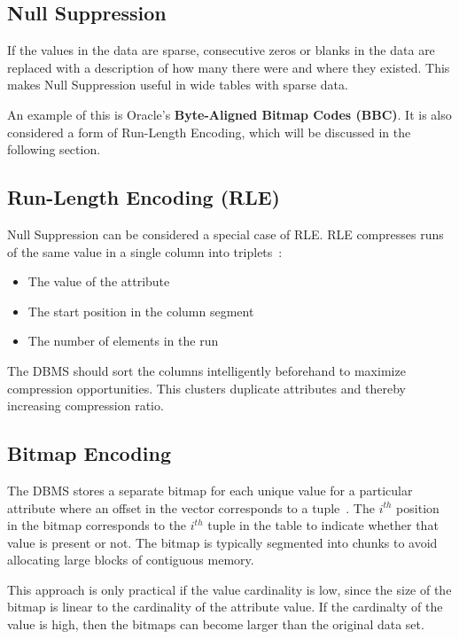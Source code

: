 \documentclass[11pt]{article}
\begin{document}
\subsection*{Null Suppression}
If the values in the data are sparse, consecutive zeros or blanks in the data are replaced with a description of how many there were and where they existed. This makes Null Suppression useful in wide tables with sparse data.

An example of this is Oracle’s \textbf{Byte-Aligned Bitmap Codes (BBC)}. It is also considered a form of Run-Length Encoding, which will be discussed in the following section.

\subsection*{Run-Length Encoding (RLE)}
Null Suppression can be considered a special case of RLE. RLE compresses runs of the same value
in a single column into triplets~\cite{p31-roth}:
\begin{itemize}
    \item The value of the attribute
    \item The start position in the column segment
    \item The number of elements in the run
\end{itemize}
The DBMS should sort the columns intelligently beforehand to maximize compression opportunities. This clusters duplicate attributes and thereby increasing compression ratio.

\subsection*{Bitmap Encoding}
The DBMS stores a separate bitmap for each unique value for a particular attribute where an offset
in the vector corresponds to a tuple~\cite{franklin14}. The $i^{th}$ position in the bitmap
corresponds to the $i^{th}$ tuple in the table to indicate whether that value is present or not. The
bitmap is typically segmented into chunks to avoid allocating large blocks of contiguous memory.

This approach is only practical if the value cardinality is low, since the size of the bitmap is
linear to the cardinality of the attribute value. If the cardinalty of the value is high, then the
bitmaps can become larger than the original data set.
\end{document}
